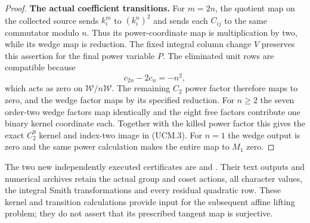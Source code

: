 \begin{proof}
\par\medskip\noindent\textbf{The actual coefficient transitions.}\quad
For $m=2n$, the quotient map on the collected source sends
$k_i^m$ to $(k_i^n)^2$ and sends each $C_{ij}$ to the
same commutator modulo $n$. Thus its power-coordinate map
is multiplication by two, while its wedge map is reduction.
The fixed integral column change $V$ preserves this assertion
for the final power variable $P$.
The eliminated unit rows are compatible because
\[
                          c_{2n}-2c_n=-n^2,
                                                        \tag{UCM.11}
\]
which acts as zero on $\mathcal W/n\mathcal W$.
The remaining $C_2$ power factor therefore maps to zero,
and the wedge factor maps by its specified reduction.
For $n\geq2$ the seven order-two wedge factors map
identically and the eight free factors contribute one
binary kernel coordinate each. Together with the killed
power factor this gives the exact $C_2^9$ kernel and
index-two image in (UCM.3).
For $n=1$ the wedge output is zero and the same power
calculation makes the entire map to $M_1$ zero.
\end{proof}

The two new independently executed certificates are
and .
Their text outputs and numerical archives retain the actual
group and coset actions, all character values, the integral
Smith transformations and every residual quadratic row.
These kernel and transition calculations provide input for
the subsequent affine lifting problem; they do not assert
that its prescribed tangent map is surjective.
